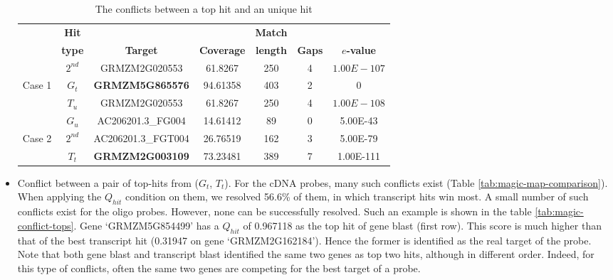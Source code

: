 \begin{itemize}
\begin{table}[b]
	\centering
	\begin{footnotesize}
	\caption{The conflicts between a top hit and an unique hit} 
	\label{tab:magic-conflict-topuniq}
	\begin{tabular}{@{}c|cccccc@{}}
	\toprule
	& \textbf{Hit} & & & \textbf{Match} & & \\
	& \textbf{type} & \textbf{Target} & \textbf{Coverage} & \textbf{length} 
	& \textbf{Gaps} & \textbf{$e$-value} \\ 
	\midrule
	& $2^{nd}$  & GRMZM2G020553 & 61.8267 & 250 & 4 & $1.00E-107$ \\ 
	Case 1 & \textbf{$G_t$} & \textbf{GRMZM5G865576} & 94.61358 & 403 & 2 & 0 
	\\ 
	& $T_u$ & GRMZM2G020553 & 61.8267 & 250 & 4 & $1.00E-108$ \\

 	\hline
 	
	& $G_u$ & AC206201.3\_FG004 & 14.61412 & 89 & 0 & 5.00E-43 \\
	Case 2 & $2^{nd}$ & AC206201.3\_FGT004 & 26.76519 & 162 & 3 & 5.00E-79 
	\\
	& $T_t$ & \textbf{GRMZM2G003109} & 73.23481 & 389 & 7 & 1.00E-111 \\
	\bottomrule
	\end{tabular}
	\end{footnotesize}
\end{table}

\item Conflict between a pair of top-hits from ($G_t$, $T_t$). 
For the cDNA probes, many such conflicts exist (Table 
\ref{tab:magic-map-comparison}). When applying the $Q_{hit}$ condition on them, 
we resolved 56.6\% of them, in which transcript hits win most.  
A small number of such conflicts exist for the oligo probes. However, none can 
be successfully resolved.
Such an example is shown in the table \ref{tab:magic-conflict-tops}. Gene  
‘GRMZM5G854499’ has a $Q_{hit}$ of 0.967118 as the top hit of gene blast (first 
row).  This score is much higher than that of the best transcript hit (0.31947 
on gene ‘GRMZM2G162184’).  Hence the former is identified as the real target of 
the probe. 
Note that both gene blast and transcript blast identified the same two genes as 
top two hits, although in different order.
Indeed, for this type of conflicts, often the same two genes are competing for 
the best target of a probe. 

\end{itemize}

